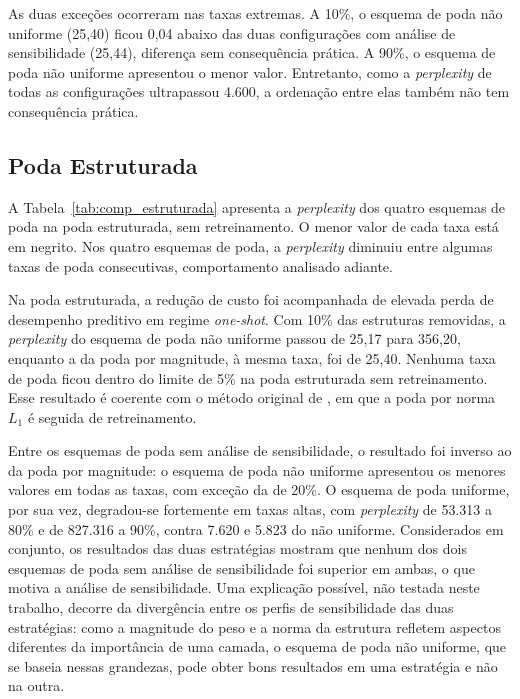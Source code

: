 As duas exceções ocorreram nas taxas extremas. A 10\%, o esquema de poda não uniforme (25,40)
ficou 0,04 abaixo das duas configurações com análise de sensibilidade (25,44), diferença sem
consequência prática. A 90\%, o esquema de poda não uniforme apresentou o menor valor.
Entretanto, como a \textit{perplexity} de todas as configurações ultrapassou 4.600, a ordenação
entre elas também não tem consequência prática.

\subsection{Poda Estruturada}\label{subsec:aloc_estruturada}\label{sec:res_estruturada}

A Tabela~\ref{tab:comp_estruturada} apresenta a \textit{perplexity} dos quatro esquemas de poda
na poda estruturada, sem retreinamento. O menor valor de cada taxa está em negrito. Nos quatro
esquemas de poda, a \textit{perplexity} diminuiu entre algumas taxas de poda consecutivas,
comportamento analisado adiante.

\begin{table}[htb]
\centering
\caption{\textit{Perplexity} da poda estruturada, sem retreinamento, nos quatro esquemas de
poda.}
\label{tab:comp_estruturada}
\small

\end{table}

Na poda estruturada, a redução de custo foi acompanhada de elevada perda de desempenho
preditivo em regime \textit{one-shot}. Com 10\% das estruturas removidas, a \textit{perplexity}
do esquema de poda não uniforme passou de 25,17 para 356,20, enquanto a da poda por magnitude,
à mesma taxa, foi de 25,40. Nenhuma taxa de poda ficou dentro do limite de 5\% na poda
estruturada sem retreinamento. Esse resultado é coerente com o método original de
, em que a poda por norma $L_1$ é seguida de retreinamento.

Entre os esquemas de poda sem análise de sensibilidade, o resultado foi inverso ao da poda por
magnitude: o esquema de poda não uniforme apresentou os menores valores em todas as taxas, com
exceção da de 20\%. O esquema de poda uniforme, por sua vez, degradou-se fortemente em taxas
altas, com \textit{perplexity} de 53.313 a 80\% e de 827.316 a 90\%, contra 7.620 e 5.823 do
não uniforme. Considerados em conjunto, os resultados das duas estratégias mostram que nenhum
dos dois esquemas de poda sem análise de sensibilidade foi superior em ambas, o que motiva a
análise de sensibilidade. Uma explicação possível, não testada neste trabalho, decorre da
divergência entre os perfis de sensibilidade das duas estratégias: como a magnitude do peso e a norma da estrutura refletem
aspectos diferentes da importância de uma camada, o esquema de poda não uniforme, que se baseia
nessas grandezas, pode obter bons resultados em uma estratégia e não na outra.

